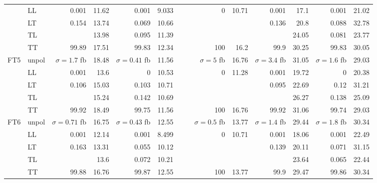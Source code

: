 \begin{table}[h]
{\begin{tabular}{llrrrrrrrrrrrr}
 & LL & \num{0.001} & \num{11.62} & \num{0.001} & \num{9.033} &  &  & \num{0} & \num{10.71} & \num{0.001} & \num{17.1} & \num{0.001} & \num{21.02} \\
 & LT & \num{0.154} & \num{13.74} & \num{0.069} & \num{10.66} &  &  &  &  & \num{0.136} & \num{20.8} & \num{0.088} & \num{32.78} \\
 & TL &  & \num{13.98} & \num{0.095} & \num{11.39} &  &  &  &  &  & \num{24.05} & \num{0.081} & \num{23.77} \\
 & TT & \num{99.89} & \num{17.51} & \num{99.83} & \num{12.34} &  &  & \num{100} & \num{16.2} & \num{99.9} & \num{30.25} & \num{99.83} & \num{30.05} \\
\midrule
\multirow{5}{*}{FT5}
 & unpol & $\sigma = \num{1.7}$ fb & \num{18.48} & $\sigma = \num{0.41}$ fb & \num{11.56} &  &  & $\sigma = \num{5}$ fb & \num{16.76} & $\sigma = \num{3.4}$ fb & \num{31.05} & $\sigma = \num{1.6}$ fb & \num{29.03} \\
 & LL & \num{0.001} & \num{13.6} & \num{0} & \num{10.53} &  &  & \num{0} & \num{11.28} & \num{0.001} & \num{19.72} & \num{0} & \num{20.38} \\
 & LT & \num{0.106} & \num{15.03} & \num{0.103} & \num{10.71} &  &  &  &  & \num{0.095} & \num{22.69} & \num{0.12} & \num{31.21} \\
 & TL &  & \num{15.24} & \num{0.142} & \num{10.69} &  &  &  &  &  & \num{26.27} & \num{0.138} & \num{25.09} \\
 & TT & \num{99.92} & \num{18.49} & \num{99.75} & \num{11.56} &  &  & \num{100} & \num{16.76} & \num{99.92} & \num{31.06} & \num{99.74} & \num{29.03} \\
\midrule
\multirow{5}{*}{FT6}
 & unpol & $\sigma = \num{0.71}$ fb & \num{16.75} & $\sigma = \num{0.43}$ fb & \num{12.55} &  &  & $\sigma = \num{0.5}$ fb & \num{13.77} & $\sigma = \num{1.4}$ fb & \num{29.44} & $\sigma = \num{1.8}$ fb & \num{30.34} \\
 & LL & \num{0.001} & \num{12.14} & \num{0.001} & \num{8.499} &  &  & \num{0} & \num{10.71} & \num{0.001} & \num{18.06} & \num{0.001} & \num{22.49} \\
 & LT & \num{0.163} & \num{13.31} & \num{0.055} & \num{10.12} &  &  &  &  & \num{0.139} & \num{20.11} & \num{0.071} & \num{31.15} \\
 & TL &  & \num{13.6} & \num{0.072} & \num{10.21} &  &  &  &  &  & \num{23.64} & \num{0.065} & \num{22.44} \\
 & TT & \num{99.88} & \num{16.76} & \num{99.87} & \num{12.55} &  &  & \num{100} & \num{13.77} & \num{99.9} & \num{29.47} & \num{99.86} & \num{30.34} \\

\end{tabular}}
\end{table}

